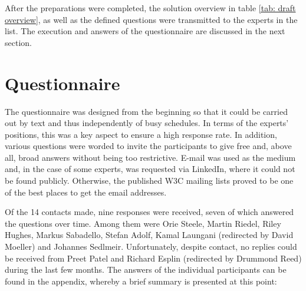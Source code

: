     After the preparations were completed, the solution overview in 
    table \ref{tab: draft overview}, as well as the defined questions were transmitted to the experts in the list. The execution and answers of the questionnaire are discussed in the next section.

	\section{Questionnaire}

	The questionnaire was designed from the beginning so that it could be carried out by text and thus independently of busy schedules. In terms of the experts' positions, this was a key aspect to ensure a high response rate. In addition, various questions were worded to invite the participants to give free and, above all, broad answers without being too restrictive. E-mail was used as the medium and, in the case of some experts, was requested via LinkedIn, where it could not be found publicly. Otherwise, the published W3C mailing lists proved to be one of the best places to get the email addresses.
	
	Of the 14 contacts made, nine responses were received, seven of which answered the questions over time. Among them were Orie Steele, Martin Riedel, Riley Hughes, Markus Sabadello, Stefan Adolf, Kamal Laungani (redirected by David Moeller) and Johannes Sedlmeir. Unfortunately, despite contact, no replies could be received from Preet Patel and Richard Esplin (redirected by Drummond Reed) during the last few months. The answers of the individual participants can be found in the appendix, whereby a brief summary is presented at this point:
	
